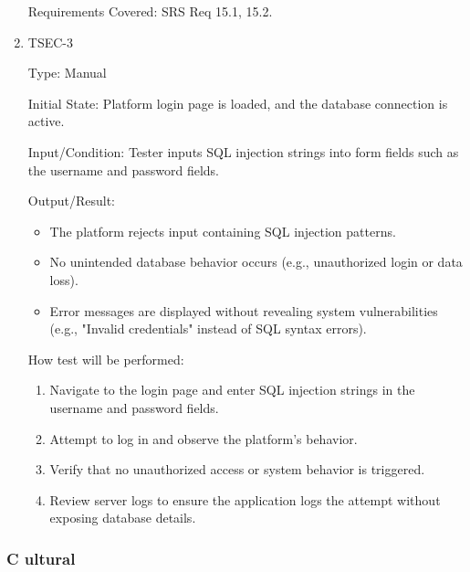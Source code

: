 \documentclass[12pt, titlepage]{article}
\begin{document}
\begin{enumerate}
          Requirements Covered: SRS Req 15.1, 15.2.

    \item{TSEC-3\\}

          Type: Manual

          Initial State: Platform login page is loaded, and the database connection is active.

          Input/Condition: Tester inputs SQL injection strings into form fields such as the username and password fields.

          Output/Result:

          \begin{itemize}
              \item{The platform rejects input containing SQL injection patterns.}
              \item{No unintended database behavior occurs (e.g., unauthorized login or data loss).}
              \item{Error messages are displayed without revealing system vulnerabilities (e.g., "Invalid credentials" instead of SQL syntax errors).}
          \end{itemize}

          How test will be performed:
          \begin{enumerate}
              \item{Navigate to the login page and enter SQL injection strings in the username and password fields.}
              \item{Attempt to log in and observe the platform's behavior.}
              \item{Verify that no unauthorized access or system behavior is triggered.}
              \item{Review server logs to ensure the application logs the attempt without exposing database details.}
          \end{enumerate}

\end{enumerate}

\subsubsection{C ultural}
\end{document}

